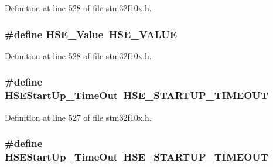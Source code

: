 Definition at line 528 of file stm32f10x.\+h.

\subsubsection[{\texorpdfstring{H\+S\+E\+\_\+\+Value}{HSE_Value}}]{\setlength{\rightskip}{0pt plus 5cm}\#define H\+S\+E\+\_\+\+Value~{\bf H\+S\+E\+\_\+\+V\+A\+L\+UE}}\hypertarget{group___exported__types_gab12a1abe6dd0001e7a0487a8b175b28c}{}\label{group___exported__types_gab12a1abe6dd0001e7a0487a8b175b28c}


Definition at line 528 of file stm32f10x.\+h.

\subsubsection[{\texorpdfstring{H\+S\+E\+Start\+Up\+\_\+\+Time\+Out}{HSEStartUp_TimeOut}}]{\setlength{\rightskip}{0pt plus 5cm}\#define H\+S\+E\+Start\+Up\+\_\+\+Time\+Out~{\bf H\+S\+E\+\_\+\+S\+T\+A\+R\+T\+U\+P\+\_\+\+T\+I\+M\+E\+O\+UT}}\hypertarget{group___exported__types_ga7e69dacd5c3b950b5b1786d7336b30d3}{}\label{group___exported__types_ga7e69dacd5c3b950b5b1786d7336b30d3}


Definition at line 527 of file stm32f10x.\+h.

\subsubsection[{\texorpdfstring{H\+S\+E\+Start\+Up\+\_\+\+Time\+Out}{HSEStartUp_TimeOut}}]{\setlength{\rightskip}{0pt plus 5cm}\#define H\+S\+E\+Start\+Up\+\_\+\+Time\+Out~{\bf H\+S\+E\+\_\+\+S\+T\+A\+R\+T\+U\+P\+\_\+\+T\+I\+M\+E\+O\+UT}}\hypertarget{group___exported__types_ga7e69dacd5c3b950b5b1786d7336b30d3}{}\label{group___exported__types_ga7e69dacd5c3b950b5b1786d7336b30d3}


